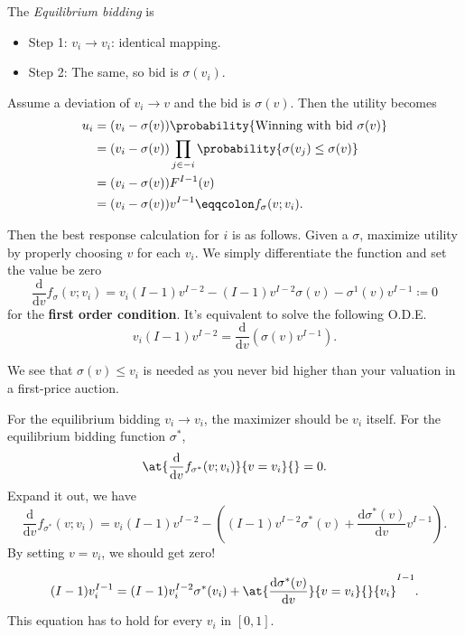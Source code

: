 \begin{remark}
	The \emph{Equilibrium bidding} is
	\begin{itemize}
		\item Step 1: \(v_{i}\to v_{i}\): identical mapping.
		\item Step 2: The same, so bid is \(\sigma(v_{i})\).
	\end{itemize}
\end{remark}

Assume a deviation of \(v_{i}\to v\) and the bid is \(\sigma(v)\). Then the utility becomes
\[
	\begin{split}
		u_{i} &= (v_{i} - \sigma(v))\probability{ \text{Winning with bid } \sigma(v)}\\
		&= (v_{i} - \sigma(v))\prod\limits_{j\in -i}\probability{\sigma(v_{j})\leq \sigma(v)}\\
		&= (v_{i} - \sigma(v))F^{I-1}(v)\\
		&= (v_{i} - \sigma(v))v^{I-1} \eqqcolon f_{\sigma}(v; v_{i}).
	\end{split}
\]

Then the best response calculation for \(i\) is as follows. Given a \(\sigma\), maximize utility by properly choosing \(v\) for each \(v_{i}\).
We simply differentiate the function and set the value be zero
\[
	\frac{\mathrm{d}}{\mathrm{d}v}f_{\sigma}(v;v_{i}) = v_{i}(I - 1)v^{I-2} - (I - 1)v^{I-2}\sigma(v) - \sigma^1(v)v^{I-1} \coloneqq 0
\]
for the \textbf{first order condition}. It's equivalent to solve the following O.D.E.
\[
	v_{i}(I - 1)v^{I-2} = \frac{\mathrm{d}}{\mathrm{d}v} (\sigma(v)v^{I-1}).
\]

We see that \(\sigma(v)\leq v_{i}\) is needed as you never bid higher than your valuation in a first-price auction.

\hr

For the equilibrium bidding \(v_{i}\to v_{i}\), the maximizer should be \(v_{i}\) itself. For the equilibrium bidding function \(\sigma^{*}\),
\[
	\at{\frac{\mathrm{d}}{\mathrm{d}v} f_{\sigma^{*}}(v;v_{i})}{v = v_{i}}{} = 0.
\]
Expand it out, we have
\[
	\frac{\mathrm{d}}{\mathrm{d}v} f_{\sigma^{*}}(v;v_{i}) = v_{i}(I - 1)v^{I-2} - \left((I - 1)v^{I-2}\sigma^{*}(v) + \frac{\mathrm{d}\sigma^{*}(v)}{\mathrm{d}v} v^{I-1}\right).
\]
By setting \(v = v_{i}\), we should get zero!

\[
	(I - 1)v_{i}^{I-1} = (I - 1)v_{i}^{I-2}\sigma^{*}(v_{i})+\at{\frac{\mathrm{d}\sigma^{*}(v)}{\mathrm{d}v}}{v = v_{i}}{}{v_{i}}^{I-1}.
\]
This equation has to hold for every \(v_{i}\) in \([0, 1]\).

